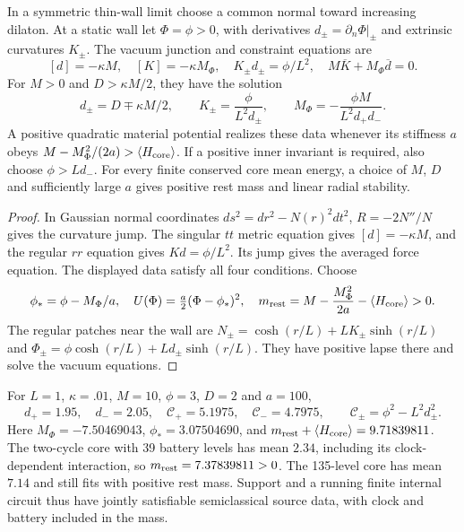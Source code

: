\begin{proposition}
\label{prop:material-support}
In a symmetric thin-wall limit choose a common normal toward increasing
dilaton. At a static wall let $\Phi=\phi>0$, with derivatives
$d_\pm=\partial_n\Phi|_\pm$ and extrinsic curvatures $K_\pm$.
The vacuum junction and constraint equations are
\begin{equation}\label{eq:material-junction}
 [d]=-\kappa M,\quad [K]=-\kappa M_\Phi,\quad
 K_\pm d_\pm=\phi/L^2,\quad M\overline K+M_\Phi\overline d=0.
\end{equation}
For $M>0$ and $D>\kappa M/2$, they have the solution
\[
 d_\pm=D\mp\kappa M/2,\qquad
 K_\pm=\frac{\phi}{L^2d_\pm},\qquad
 M_\Phi=-\frac{\phi M}{L^2d_+d_-}.
\]
A positive quadratic material potential realizes these data whenever
its stiffness $a$ obeys $M-M_\Phi^2/(2a)>\langle H_{\rm core}\rangle$.
If a positive inner invariant is required, also choose $\phi>Ld_-$.
For every finite conserved core mean energy, a choice of $M$, $D$ and
sufficiently large $a$ gives positive rest mass and linear radial stability.
\end{proposition}
\begin{proof}
In Gaussian normal coordinates $ds^2=dr^2-N(r)^2dt^2$,
$R=-2N''/N$ gives the curvature jump. The singular $tt$ metric equation
gives $[d]=-\kappa M$, and the regular $rr$ equation gives
$Kd=\phi/L^2$. Its jump gives the averaged force equation.
The displayed data satisfy all four conditions. Choose
\[
 \phi_* =\phi-M_\Phi/a,\quad
 U(\Phi)=\tfrac a2(\Phi-\phi_*)^2,\quad
 m_{\rm rest}=M-\frac{M_\Phi^2}{2a}-\langle H_{\rm core}\rangle>0.
\]
The regular patches near the wall are
$N_\pm=\cosh(r/L)+LK_\pm\sinh(r/L)$ and
$\Phi_\pm=\phi\cosh(r/L)+Ld_\pm\sinh(r/L)$.
They have positive lapse there and solve the vacuum equations.
\end{proof}

For $L=1$, $\kappa=.01$, $M=10$, $\phi=3$, $D=2$ and $a=100$,
\[
 d_+=1.95,\quad d_-=2.05,\quad
 \mathcal C_+=5.1975,\quad \mathcal C_-=4.7975,
 \qquad \mathcal C_\pm=\phi^2-L^2d_\pm^2.
\]
Here $M_\Phi=-7.50469043$, $\phi_*=3.07504690$, and
$m_{\rm rest}+\langle H_{\rm core}\rangle=9.71839811$.
The two-cycle core with 39 battery levels has mean $2.34$, including
its clock-dependent interaction, so $m_{\rm rest}=7.37839811>0$.
The 135-level core has mean $7.14$ and still fits with positive rest mass.
Support and a running finite internal circuit thus have jointly satisfiable
semiclassical source data, with clock and battery included in the mass.

